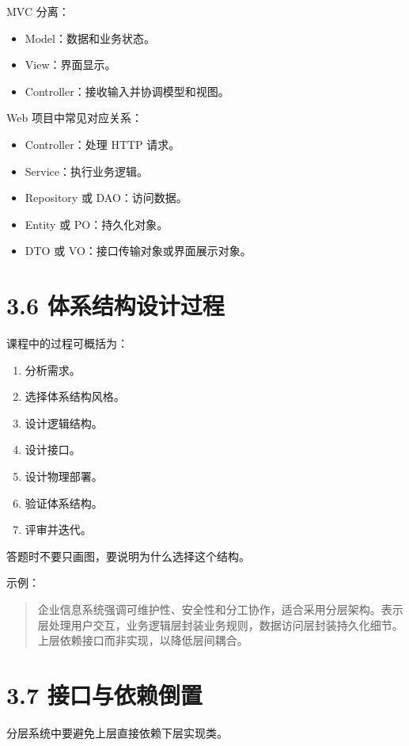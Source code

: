 \documentclass[UTF8,zihao=-4]{ctexart}
\begin{document}
MVC 分离：

\begin{itemize}
\item Model：数据和业务状态。
\item View：界面显示。
\item Controller：接收输入并协调模型和视图。
\end{itemize}

Web 项目中常见对应关系：

\begin{itemize}
\item Controller：处理 HTTP 请求。
\item Service：执行业务逻辑。
\item Repository 或 DAO：访问数据。
\item Entity 或 PO：持久化对象。
\item DTO 或 VO：接口传输对象或界面展示对象。
\end{itemize}

\section{3.6 体系结构设计过程}

课程中的过程可概括为：

\begin{enumerate}
\item 分析需求。
\item 选择体系结构风格。
\item 设计逻辑结构。
\item 设计接口。
\item 设计物理部署。
\item 验证体系结构。
\item 评审并迭代。
\end{enumerate}

答题时不要只画图，要说明为什么选择这个结构。

示例：

\begin{quote}
企业信息系统强调可维护性、安全性和分工协作，适合采用分层架构。表示层处理用户交互，业务逻辑层封装业务规则，数据访问层封装持久化细节。上层依赖接口而非实现，以降低层间耦合。
\end{quote}

\section{3.7 接口与依赖倒置}

分层系统中要避免上层直接依赖下层实现类。
\end{document}
